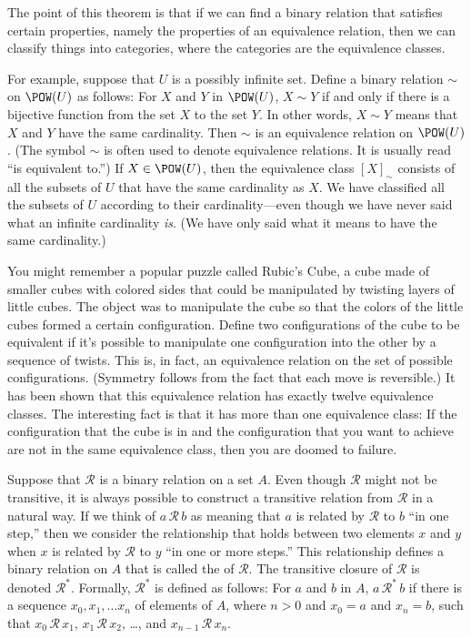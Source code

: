 The point of this theorem is that if we can find a binary relation
that satisfies certain properties, namely the properties of
an equivalence relation, then we can classify things
into categories, where the categories are the equivalence classes.

For example, suppose that $U$ is a possibly infinite set.  Define a binary relation
$\sim$ on $\POW(U)$ as follows: For $X$ and $Y$ in $\POW(U)$,
$X\sim Y$ if and only if there is a bijective function
from the set $X$ to the set $Y$.  In other words, $X\sim Y$
means that $X$ and $Y$ have the same cardinality.  Then
$\sim$ is an equivalence relation on $\POW(U)$.  (The symbol
$\sim$ is often used to denote equivalence relations.  It is
usually read ``is equivalent to.'')  If $X\in\POW(U)$, then
the equivalence class $[X]_{\sim}$ consists of all the subsets
of $U$ that have the same cardinality as $X$.  We have classified
all the subsets of $U$ according to their cardinality---even though
we have never said what an infinite cardinality \emph{is}.  (We
have only said what it means to have the same cardinality.)

You might remember a popular puzzle called Rubic's Cube,
a cube made of smaller cubes with colored sides that could
be manipulated by twisting layers of little cubes.  The object
was to manipulate the cube so that the colors of the little cubes
formed a certain configuration.  Define two configurations
of the cube to be equivalent if it's possible to manipulate one
configuration into the other by a sequence of twists.  This is,
in fact, an equivalence relation on the set of possible configurations.
(Symmetry follows from the fact that each move is reversible.)
It has been shown that this equivalence relation has exactly twelve
equivalence classes.  The interesting fact is that it has more
than one equivalence class:  If the configuration that the cube
is in and the configuration that you want to achieve are not
in the same equivalence class, then you are doomed to failure.

\medbreak

Suppose that $\mathscr R$ is a binary relation on a set $A$.
Even though $\mathscr R$ might not be transitive, it is always
possible to construct a transitive relation from $\mathscr R$ in
a natural way.  If we think of $a\,{\mathscr R}\,b$ as meaning
that $a$ is related by $\mathscr R$ to $b$ ``in one step,'' then
we consider the relationship that holds between two elements 
$x$ and $y$ when $x$ is related by $\mathscr R$ to $y$ ``in one 
or more steps.''  This relationship defines a binary relation
on $A$ that is called the  of $\mathscr R$.
The transitive closure of $\mathscr R$ is denoted ${\mathscr R}^*$.
Formally, ${\mathscr R}^*$ is defined as follows:  For $a$ and $b$ in $A$, 
$a\,{\mathscr R}^*\,b$ if there is a sequence $x_0,x_1,\dots x_n$
of elements of $A$, where $n>0$ and $x_0=a$ and $x_n=b$,
such that $x_0\,{\mathscr R}\,x_1$, 
$x_1\,{\mathscr R}\,x_2$, \dots, and $x_{n-1}\,{\mathscr R}\,x_n$.


